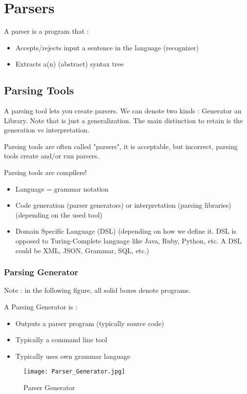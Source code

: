 \chapter{Parsers}
\label{chap:Parsers}
\theoremstyle{definition}
\begin{definition}[Parser]
    A parser is a program that : 
    \begin{itemize}
        \item Accepts/rejects input a sentence in the language (recognizer)
        \item Extracts a(n) (abstract) syntax tree
    \end{itemize}
\end{definition}
    \section{Parsing Tools}
        A parsing tool lets you create parsers. We can denote two kinds :
        Generator an Library. Note that is just a generalization. The main
        distinction to retain is the generation vs interpretation.

        Parsing tools are often called "parsers", it is acceptable, but
        incorrect, parsing tools create and/or run parsers.

        Parsing tools are compilers! 
        \begin{itemize}
            \item Language = grammar notation
            \item Code generation (parser generators) or interpretation (parsing
            libraries) (depending on the used tool)
            \item Domain Specific Language (DSL) (depending on how we define it.
            DSL is opposed to Turing-Complete language like Java, Ruby, Python,
            etc. A DSL could be XML, JSON, Grammar, SQL, etc.)
        \end{itemize}
        \subsection{Parsing Generator}
            Note : in the following figure, all solid boxes denote programs.
            \theoremstyle{definition}
            \begin{definition}
                A Parsing Generator is :
                \begin{itemize}
                    \item Outputs a parser program (typically source code)
                    \item Typically a command line tool
                    \item Typically uses own grammar language
                \end{itemize}
            \end{definition}
            \begin{figure}[H]
                 \centering
                 \texttt{[image: Parser\_Generator.jpg]}
                 \caption{Parser Generator}
                 \label{fig:parser_gen}
            \end{figure}

